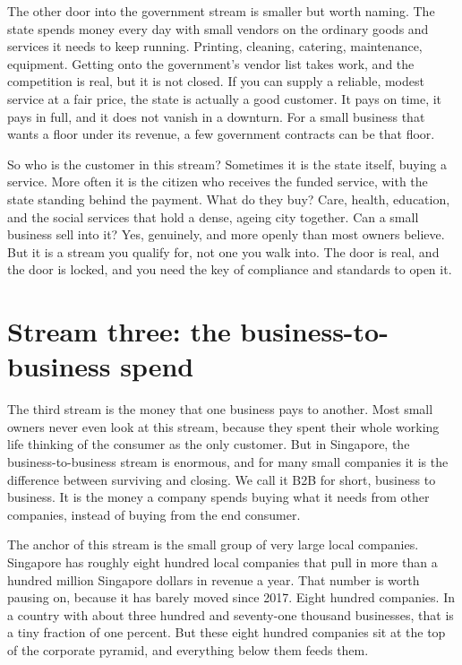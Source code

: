 \documentclass[10pt,twoside,openany]{memoir}
\newcommand{\needspacehead}{\needspace{4\baselineskip}}
\let\oldsection\section
\renewcommand{\section}{\needspacehead\oldsection}
\begin{document}
{{{{{{{{{{{{{{The other door into the government stream is smaller but worth naming.
The state spends money every day with small vendors on the ordinary
goods and services it needs to keep running. Printing, cleaning,
catering, maintenance, equipment. Getting onto the government's vendor
list takes work, and the competition is real, but it is not closed. If
you can supply a reliable, modest service at a fair price, the state is
actually a good customer. It pays on time, it pays in full, and it does
not vanish in a downturn. For a small business that wants a floor under
its revenue, a few government contracts can be that floor.

So who is the customer in this stream? Sometimes it is the state itself,
buying a service. More often it is the citizen who receives the funded
service, with the state standing behind the payment. What do they buy?
Care, health, education, and the social services that hold a dense,
ageing city together. Can a small business sell into it? Yes, genuinely,
and more openly than most owners believe. But it is a stream you qualify
for, not one you walk into. The door is real, and the door is locked,
and you need the key of compliance and standards to open it.

\section{Stream three: the business-to-business
spend}\label{stream-three-the-business-to-business-spend}

The third stream is the money that one business pays to another. Most
small owners never even look at this stream, because they spent their
whole working life thinking of the consumer as the only customer. But in
Singapore, the business-to-business stream is enormous, and for many
small companies it is the difference between surviving and closing. We
call it B2B for short, business to business. It is the money a company
spends buying what it needs from other companies, instead of buying from
the end consumer.

The anchor of this stream is the small group of very large local
companies. Singapore has roughly eight hundred local companies that pull
in more than a hundred million Singapore dollars in revenue a year. That
number is worth pausing on, because it has barely moved since 2017.
Eight hundred companies. In a country with about three hundred and
seventy-one thousand businesses, that is a tiny fraction of one percent.
But these eight hundred companies sit at the top of the corporate
pyramid, and everything below them feeds them.

}}}}}}}}}}}}}}
\end{document}

